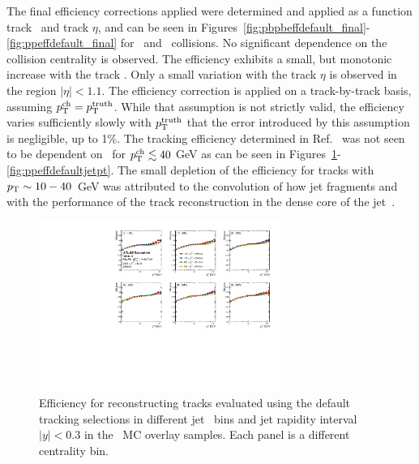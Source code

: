 The final efficiency corrections applied were determined and applied as a function track \pt\ and track $\eta$, and can be seen in Figures~\ref{fig:pbpbeffdefault_final}-\ref{fig:ppeffdefault_final} for \pp\ and \PbPb\ collisions.
No significant dependence on the collision centrality is observed.
The efficiency exhibits a small, but monotonic increase with the track \pt.
Only a small variation with the track $\eta$ is observed in the region $|\eta|<1.1$.
The efficiency correction is applied on a track-by-track basis, assuming $\mbox{$p_{\mathrm{T}}^{\mathrm{ch}}$} = \mbox{$p_{\mathrm{T}}^{\mathrm{truth}}$}$.
While that assumption is not strictly valid, the efficiency varies sufficiently slowly with $\mbox{$p_{\mathrm{T}}^{\mathrm{truth}}$}$ that the error introduced by this assumption is negligible, up to 1\%.
The tracking efficiency determined in Ref.~\cite{PhysRevC.98.024908} was not seen to be dependent on \ptjet\ for $\mbox{$p_{\mathrm{T}}^{\mathrm{ch}}$} \lesssim 40$ GeV as can be seen in Figures~\ref{fig:pbpbeffdefaultjetpt_y0}-\ref{fig:ppeffdefaultjetpt}.
The small depletion of the efficiency for tracks with $\mbox{$p_{\mathrm{T}}$} \sim 10-40$~GeV was attributed to the convolution of how jet fragments and with the performance of the track reconstruction in the dense core of the jet~\cite{PhysRevC.98.024908}.


\begin{figure}
\centering
\includegraphics[width=0.7\textwidth]{figures/main/corrections/eff_centrality_jetpt_jety0_ppTight.pdf}
\caption{Efficiency for reconstructing tracks evaluated using the default tracking selections in different jet \pT\ bins and jet rapidity interval $|y|<0.3$ in the \pbpb\ MC overlay samples.
Each panel is a different centrality bin.}
\label{fig:pbpbeffdefaultjetpt_y0}
\end{figure}

